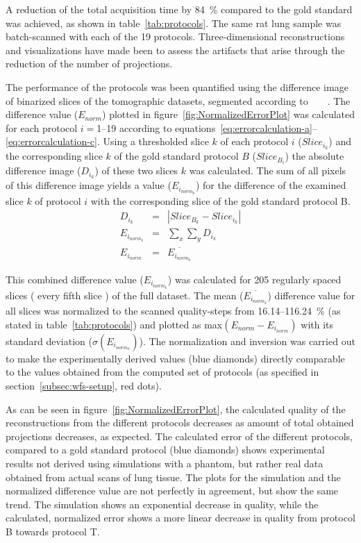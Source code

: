 A reduction of the total acquisition time by \SI{84}{\percent} compared to the gold standard was achieved, as shown in table~\ref{tab:protocols}. The same rat lung sample was batch-scanned with each of the 19 protocols. Three-dimensional reconstructions and visualizations have made been to assess the artifacts that arise through the reduction of the number of projections.

The performance of the protocols was been quantified using the difference image of binarized slices of the tomographic datasets, segmented according to%
\ifhtml%
	~\citet{Otsu1979}%
\else%
	~%
\fi%
. The difference value ($E_{norm}$) plotted in figure~\ref{fig:NormalizedErrorPlot} was calculated for each protocol $i=$1--19 according to equations~\ref{eq:errorcalculation-a}--\ref{eq:errorcalculation-c}. Using a thresholded slice $k$ of each protocol $i$ ($Slice_{i_{k}}$) and the corresponding slice $k$ of the gold standard protocol $B$ ($Slice_{B_{i}}$) the absolute difference image ($D_{i_{k}}$) of these two slices $k$ was calculated. The sum of all pixels of this difference image yields a value ($E_{i_{norm_{k}}}$) for the difference of the examined slice $k$ of protocol $i$ with the corresponding slice of the gold standard protocol B.
\begin{eqnarray}%
	D_{i_{k}} &=& |Slice_{B_{k}}-Slice_{i_{k}}|\label{eq:errorcalculation-a}\\%
	E_{i_{norm_{k}}} &=& \sum_{x}\sum_{y} D_{i_{k}}\label{eq:errorcalculation-b}\\%
	E_{i_{norm}} &=& \overline{E_{i_{norm_{k}}}}\label{eq:errorcalculation-c}%
\end{eqnarray}%

This combined difference value ($E_{i_{norm_{k}}}$) was calculated for 205 regularly spaced slices (%
every fifth slice%
) of the full dataset. The mean ($\overline{E_{i_{norm_{k}}}}$) difference value for all slices was normalized to the scanned quality-steps from 16.14--\SI{116.24}{\percent} (as stated in table~\ref{tab:protocols}) and plotted as max$(E_{norm}-E_{i_{norm}})$ with its standard deviation ($\sigma(E_{i_{norm_{k}}})$). The normalization and inversion was carried out to make the experimentally derived values (blue diamonds) directly comparable to the values obtained from the computed set of protocols (as specified in section~\ref{subsec:wfs-setup}, red dots).

As can be seen in figure~\ref{fig:NormalizedErrorPlot}, the calculated quality of the reconstructions from the different protocols decreases as amount of total obtained projections decreases, as expected. The calculated error of the different protocols, compared to a gold standard protocol (blue diamonds) shows experimental results not derived using simulations with a phantom, but rather real data obtained from actual scans of lung tissue. The plots for the simulation and the normalized difference value are not perfectly in agreement, but show the same trend. The simulation shows an exponential decrease in quality, while the calculated, normalized error shows a more linear decrease in quality from protocol B towards protocol T.

